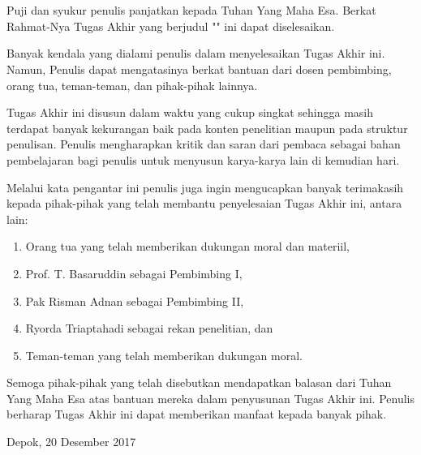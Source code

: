 \chapter*{\kataPengantar}
Puji dan syukur penulis panjatkan kepada Tuhan Yang Maha Esa. Berkat Rahmat-Nya Tugas Akhir yang berjudul "\judul" ini dapat diselesaikan.

Banyak kendala yang dialami penulis dalam menyelesaikan Tugas Akhir ini. Namun, Penulis dapat mengatasinya berkat bantuan dari dosen pembimbing, orang tua, teman-teman, dan pihak-pihak lainnya.
 
Tugas Akhir ini disusun dalam waktu yang cukup singkat sehingga masih terdapat banyak kekurangan baik pada konten penelitian maupun pada struktur penulisan. 
Penulis mengharapkan kritik dan saran dari pembaca sebagai bahan pembelajaran bagi penulis untuk menyusun karya-karya lain di kemudian hari.

Melalui kata pengantar ini penulis juga ingin mengucapkan banyak terimakasih kepada pihak-pihak yang telah membantu penyelesaian Tugas Akhir ini, antara lain:

\begin{enumerate}
	\item Orang tua yang telah memberikan dukungan moral dan materiil,
	\item Prof. T. Basaruddin sebagai Pembimbing I,
	\item Pak Risman Adnan sebagai Pembimbing II, 
	\item Ryorda Triaptahadi sebagai rekan penelitian, dan
	\item Teman-teman yang telah memberikan dukungan moral. 
\end{enumerate}

Semoga pihak-pihak yang telah disebutkan mendapatkan balasan dari Tuhan Yang Maha Esa atas bantuan mereka dalam penyusunan Tugas Akhir ini. Penulis berharap Tugas Akhir ini dapat memberikan manfaat kepada banyak pihak. 


\vspace*{0.1cm}
\begin{flushright}
Depok, 20 Desember 2017\\[0.1cm]
\vspace*{1cm}
\penulis

\end{flushright}